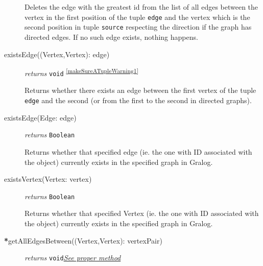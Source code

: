 \documentclass{article}
\newlength\q
\begin{document}
\begin{description}
  Deletes the edge with the greatest id from the list of all edges
  between the vertex in the first position of the tuple \texttt{edge} and the vertex which is the second position in tuple \texttt{source} respecting
  the direction if the graph has directed edges. If no such edge exists, nothing happens.




\item[existsEdge((Vertex,Vertex): edge)] \emph{returns}
  \texttt{void} \textsuperscript{\ref{makeSureATupleWarning1}}

  Returns whether there exists an edge between the first vertex of the tuple \texttt{edge} and the second (or from the first to the second in directed graphs).
  
  
\item[existsEdge(Edge: edge)] \emph{returns}
  \texttt{Boolean}

  Returns whether that specified edge (ie. the one with ID associated with the object) currently exists in the specified graph in Gralog. 
  

  
\item[existsVertex(Vertex: vertex)] \emph{returns}
  \texttt{Boolean}

  Returns whether that specified Vertex (ie. the one with ID associated with the object) currently exists in the specified graph in Gralog. 
  



\item[\textbf{*}getAllEdgesBetween((Vertex,Vertex): vertexPair)] \emph{returns} \texttt{void}\quad \hyperref[getAllEdgesBetweenClass]{\textit{See proper method}}


\end{description}
\end{document}
